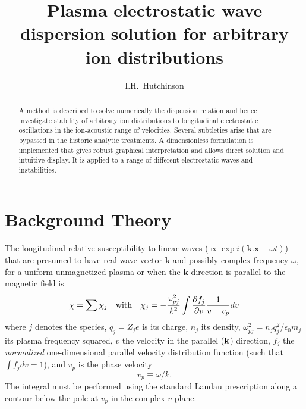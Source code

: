 \documentclass[12pt]{article}
\title{Plasma electrostatic wave dispersion solution for arbitrary ion
  distributions} \author{I.H.~Hutchinson}
\begin{document}
\maketitle

\begin{abstract}
A method is described to solve numerically the dispersion relation and hence
investigate stability of arbitrary ion distributions to longitudinal
electrostatic oscillations in the ion-acoustic range of velocities.
Several subtleties arise that are bypassed in the historic analytic
treatments. A dimensionless formulation is implemented that gives
robust graphical interpretation and allows direct solution and
intuitive display. It is applied to a range of different electrostatic
waves and instabilities. 
\end{abstract}

\section{Background Theory}

The longitudinal relative susceptibility to linear waves
($\propto \exp i({\bm k.\bm x}-\omega t)$) that are presumed to have real
wave-vector ${\bm k}$ and possibly complex frequency $\omega$, for a
uniform unmagnetized plasma or when the  $\bm k$-direction is parallel
to the magnetic field is
\begin{equation}
\chi=\sum \chi_j\quad \mbox{with}\quad
  \chi_j = -{\omega_{pj}^2\over k^2} \int {\partial
    f_j\over \partial v } {1\over v- v_p} dv
\end{equation}
where $j$ denotes the species, $q_j=Z_je$ is its charge, $n_j$ its
density, $\omega_{pj}^2=n_j q_j^2/\epsilon_0 m_j$ its plasma frequency
squared, $v$ the velocity in the parallel (${\bf k}$) direction, $f_j$
the \emph{normalized} one-dimensional parallel velocity distribution
function (such that $\int f_j dv=1$), and $v_p$ is the phase velocity
\begin{equation}
  \label{eq:phasevel}
  v_p\equiv \omega/k.
\end{equation}
The integral must be performed using the standard Landau
prescription along a contour below the pole at $v_p$ in the complex
$v$-plane.
\end{document}
